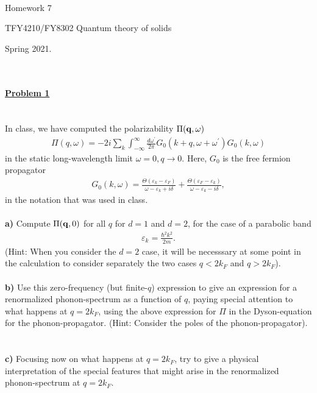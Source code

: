 \documentclass{article}
\begin{document}
\\

\centerline{\Large Homework 7}
\centerline{\Large  TFY4210/FY8302 Quantum theory of solids}
\centerline{\Large Spring 2021.}
\normalsize
\ \\
\ \\
\underline{\large\bf Problem 1}\\
\ \\
\ \\
In class, we have computed the polarizability $\Pi({\bf q}, \omega) $
\begin{eqnarray}
\Pi( q, \omega) = -2 i \sum_k \int_{-\infty}^{\infty} \frac{d \omega^{\prime}}{2 \pi} G_0(k+q,\omega + \omega^{\prime}) G_0(k,\omega) \nonumber 
\end{eqnarray}
 in the static long-wavelength limit $\omega=0, q \to 0$. Here, $G_0$ is the free fermion propagator
 \begin{eqnarray}
 G_0(k,\omega) = \frac{\Theta(\varepsilon_k-\varepsilon_F)}{\omega - \varepsilon_{k} + i \delta}
 +  \frac{\Theta(\varepsilon_F-\varepsilon_k)}{\omega - \varepsilon_{k} - i \delta}, \nonumber
 \end{eqnarray} 
 in the notation that was used in class. 
 \ \\
 \ \\
 {\bf a)} Compute $\Pi({\bf q}, 0) $ for all $q$ for $d=1$ and $d=2$, for the case of a parabolic band 
 \begin{eqnarray}
 \varepsilon_k = \frac{\hbar^2 k^2}{2m}. \nonumber
 \end{eqnarray} 
 (Hint: When you consider the $d=2$ case, it will be necesssary at some point in the calculation to consider separately the two cases $q < 2 k_F$ and $q > 2 k_F$). 
 \ \\
 \ \\
 {\bf b)} Use this zero-frequency (but finite-$q$) expression to give an expression for a renormalized phonon-spectrum as a function of $q$, paying special attention to what happens at $q=2 k_F$, using the above expression for $\Pi$ in the Dyson-equation for the phonon-propagator. (Hint: Consider the poles of the phonon-propagator). 
 \ \\
 \ \\
 {\bf c)} Focusing now on what happens at $q=2k_F$, try to give a physical interpretation of the  special features that might arise in the renormalized phonon-spectrum at $q=2 k_F$.    
 \ \\
 \ \\
\end{document}
